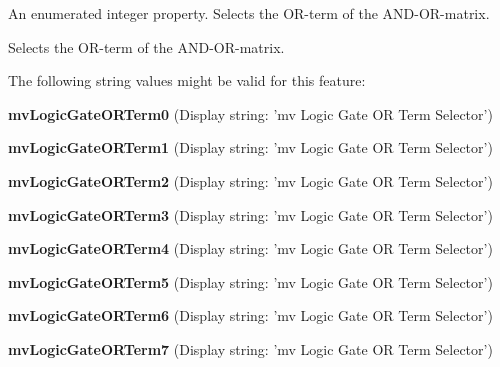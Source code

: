 An enumerated integer property. Selects the O\+R-\/term of the A\+N\+D-\/\+O\+R-\/matrix. 

Selects the O\+R-\/term of the A\+N\+D-\/\+O\+R-\/matrix.

The following string values might be valid for this feature\+:
\begin{DoxyItemize}
\item {\bfseries mv\+Logic\+Gate\+O\+R\+Term0} (Display string\+: 'mv Logic Gate O\+R Term Selector')
\item {\bfseries mv\+Logic\+Gate\+O\+R\+Term1} (Display string\+: 'mv Logic Gate O\+R Term Selector')
\item {\bfseries mv\+Logic\+Gate\+O\+R\+Term2} (Display string\+: 'mv Logic Gate O\+R Term Selector')
\item {\bfseries mv\+Logic\+Gate\+O\+R\+Term3} (Display string\+: 'mv Logic Gate O\+R Term Selector')
\item {\bfseries mv\+Logic\+Gate\+O\+R\+Term4} (Display string\+: 'mv Logic Gate O\+R Term Selector')
\item {\bfseries mv\+Logic\+Gate\+O\+R\+Term5} (Display string\+: 'mv Logic Gate O\+R Term Selector')
\item {\bfseries mv\+Logic\+Gate\+O\+R\+Term6} (Display string\+: 'mv Logic Gate O\+R Term Selector')
\item {\bfseries mv\+Logic\+Gate\+O\+R\+Term7} (Display string\+: 'mv Logic Gate O\+R Term Selector')
\end{DoxyItemize}

